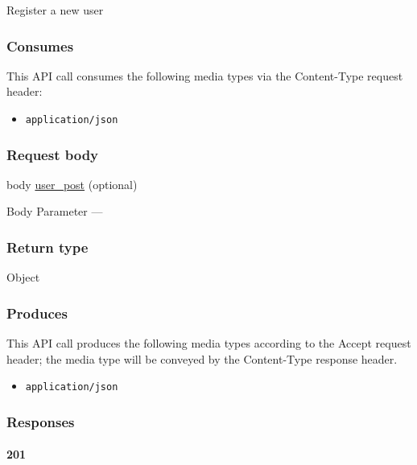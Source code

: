 Register a new user

\hypertarget{consumes-27}{%
\subsubsection{Consumes}\label{consumes-27}}

This API call consumes the following media types via the {Content-Type}
request header:

\begin{itemize}
\tightlist
\item
  \texttt{application/json}
\end{itemize}

\hypertarget{request-body-27}{%
\subsubsection{Request body}\label{request-body-27}}

body \protect\hyperlink{user_post}{user\_post} (optional)

{Body Parameter} ---

\hypertarget{return-type-64}{%
\subsubsection{Return type}\label{return-type-64}}

Object

\hypertarget{produces-78}{%
\subsubsection{Produces}\label{produces-78}}

This API call produces the following media types according to the
{Accept} request header; the media type will be conveyed by the
{Content-Type} response header.

\begin{itemize}
\tightlist
\item
  \texttt{application/json}
\end{itemize}

\hypertarget{responses-80}{%
\subsubsection{Responses}\label{responses-80}}

\hypertarget{section-260}{%
\paragraph{201}\label{section-260}}

